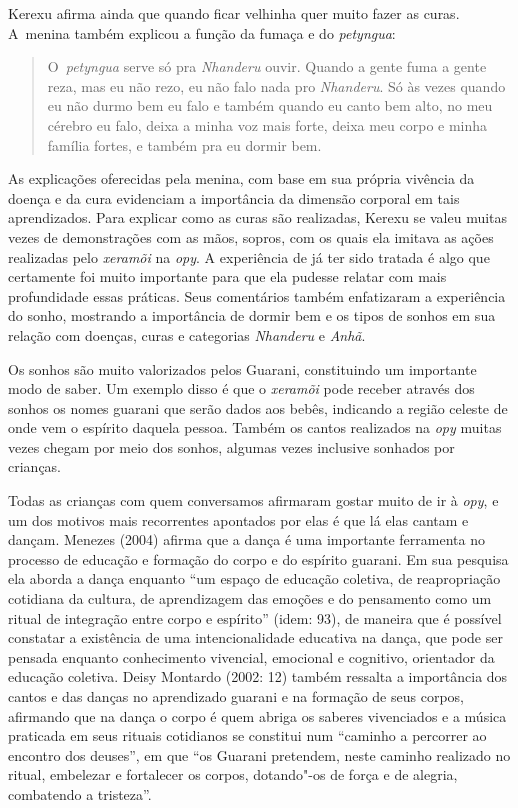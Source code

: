 Kerexu afirma ainda que quando ficar velhinha quer muito fazer as curas.
A~menina também explicou a função da fumaça e do \emph{petyngua}:

\begin{quote}
\noindent
O~\emph{petyngua} serve só pra \emph{Nhanderu} ouvir. Quando a gente fuma a gente
reza, mas eu não rezo, eu não falo nada pro \emph{Nhanderu}. Só às vezes
quando eu não durmo bem eu falo e também quando eu canto bem alto, no
meu cérebro eu falo, deixa a minha voz mais forte, deixa meu corpo e
minha família fortes, e também pra eu dormir bem.
\end{quote}

As explicações oferecidas pela menina, com base em sua própria vivência
da doença e da cura evidenciam a importância da dimensão corporal em
tais aprendizados. Para explicar como as curas são realizadas, Kerexu
se valeu muitas vezes de demonstrações com as mãos, sopros, com os
quais ela imitava as ações realizadas pelo \emph{xeramõi} na \emph{opy}. A
experiência de já ter sido tratada é algo que certamente foi muito
importante para que ela pudesse relatar com mais profundidade essas
práticas. Seus comentários também enfatizaram a experiência do sonho,
mostrando a importância de dormir bem e os tipos de sonhos em sua
relação com doenças, curas e categorias \emph{Nhanderu} e \emph{Anhã}.

Os sonhos são muito valorizados pelos Guarani, constituindo um
importante modo de saber. Um exemplo disso é que o \emph{xeramõi} pode receber
através dos sonhos os nomes guarani que serão dados aos bebês,
indicando a região celeste de onde vem o espírito daquela pessoa.
Também os cantos realizados na \emph{opy} muitas vezes chegam por meio dos
sonhos, algumas vezes inclusive sonhados por crianças.

Todas as crianças com quem conversamos afirmaram gostar muito de ir à
\emph{opy}, e um dos motivos mais recorrentes apontados por elas é que lá elas
cantam e dançam. Menezes (2004) afirma que a dança é uma importante
ferramenta no processo de educação e formação do corpo e do espírito
guarani. Em sua pesquisa ela aborda a dança enquanto ``um espaço de
educação coletiva, de reapropriação cotidiana da cultura, de
aprendizagem das emoções e do pensamento como um ritual de integração
entre corpo e espírito'' (idem: 93), de maneira que é possível constatar
a existência de uma intencionalidade educativa na dança, que pode ser
pensada enquanto conhecimento vivencial, emocional e cognitivo,
orientador da educação coletiva. Deisy Montardo (2002: 12) também
ressalta a importância dos cantos e das danças no aprendizado guarani e
na formação de seus corpos, afirmando que na dança o corpo é quem
abriga os saberes vivenciados e a música praticada em seus rituais
cotidianos se constitui num ``caminho a percorrer ao encontro dos
deuses'', em que ``os Guarani pretendem, neste caminho realizado no
ritual, embelezar e fortalecer os corpos, dotando"-os de força e de
alegria, combatendo a tristeza''.

